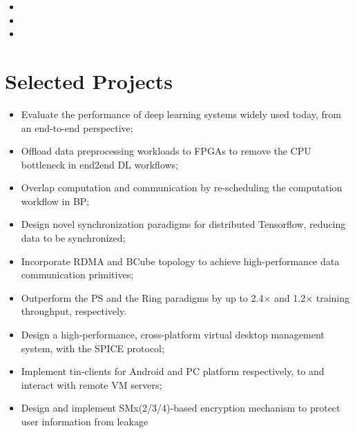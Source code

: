 \documentclass{resume}
\begin{document}
\begin{itemize}
	\item {}
	\item {}	
	\item {}
\end{itemize}


\section{Selected Projects}
\begin{itemize}
	\item Evaluate the performance of deep learning systems widely used today, from an end-to-end perspective;
	\item Offload data preprocessing workloads to FPGAs to remove the CPU bottleneck in end2end DL workflows;
	\item Overlap computation and communication by re-scheduling the computation workflow in BP;
\end{itemize}

\begin{itemize}
	\item Design novel synchronization paradigms for distributed Tensorflow, reducing data to be synchronized;
	\item Incorporate RDMA and BCube topology to achieve high-performance data communication primitives;
	\item Outperform the PS and the Ring paradigms by up to 2.4$\times$ and 1.2$\times$ training throughput, respectively.
\end{itemize}

\begin{itemize}
	\item Design a high-performance, cross-platform virtual desktop management system, with the SPICE protocol;
	\item Implement tin-clients for Android and PC platform respectively,  to and interact with remote VM servers;
	\item Design and implement SMx(2/3/4)-based encryption mechanism to protect user information from leakage
\end{itemize}
\end{document}
